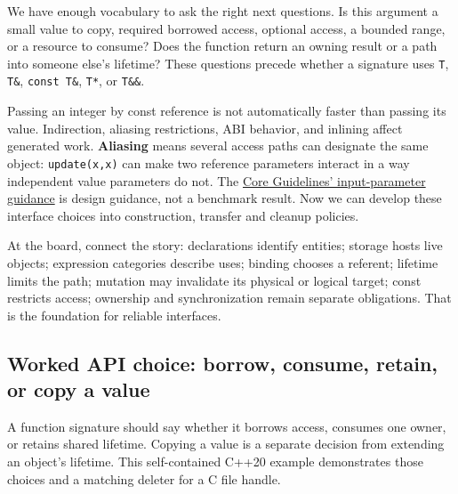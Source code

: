 \hypertarget{01-foundations-i-ch003-choose-the-access-contract-before-the-parameter-syntax}{}

We have enough vocabulary to ask the right next questions. Is this argument a small value to copy, required borrowed access, optional access, a bounded range, or a resource to consume? Does the function return an owning result or a path into someone else's lifetime? These questions precede whether a signature uses \texttt{T}, \texttt{T\&}, \texttt{const\ T\&}, \texttt{T*}, or \texttt{T\&\&}.

Passing an integer by const reference is not automatically faster than passing its value. Indirection, aliasing restrictions, ABI behavior, and inlining affect generated work. \textbf{Aliasing} means several access paths can designate the same object: \texttt{update(x,x)} can make two reference parameters interact in a way independent value parameters do not. The \href{https://isocpp.github.io/CppCoreGuidelines/CppCoreGuidelines\#f16-for-in-parameters-pass-cheaply-copied-types-by-value-and-others-by-reference-to-const}{Core Guidelines' input-parameter guidance} is design guidance, not a benchmark result. Now we can develop these interface choices into construction, transfer and cleanup policies.

At the board, connect the story: declarations identify entities; storage hosts live objects; expression categories describe uses; binding chooses a referent; lifetime limits the path; mutation may invalidate its physical or logical target; const restricts access; ownership and synchronization remain separate obligations. That is the foundation for reliable interfaces.

\subsection{Worked API choice: borrow, consume, retain, or copy a value}\label{01-foundations-i-ch003-worked-api-choice-borrow-consume-retain-or-copy-a-value}

\hypertarget{01-foundations-i-ch003-worked-api-choice-borrow-consume-retain-or-copy-a-value}{}

A function signature should say whether it borrows access, consumes one owner, or retains shared lifetime. Copying a value is a separate decision from extending an object's lifetime. This self-contained C++20 example demonstrates those choices and a matching deleter for a C file handle.


